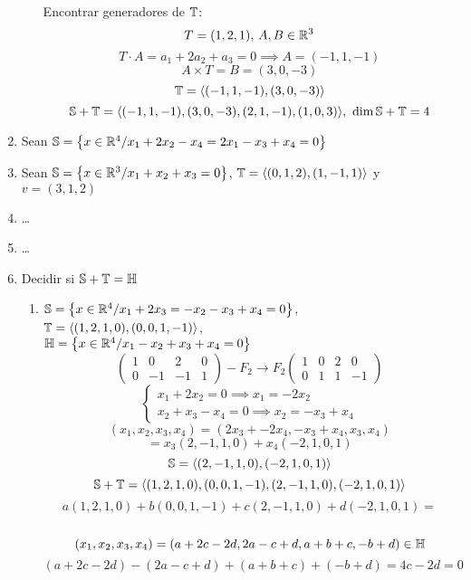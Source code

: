 \documentclass[../practica.root.tex]{subfiles}
\begin{document}
\begin{enumerate}
\begin{enumerate}
                    Encontrar generadores de $\T$:
                    \[ T = (1,2,1)\text{, }A, B \in \R^3 \]
                    \[ T\cdot A = a_1 + 2a_2 + a_3 = 0 \implies A = (-1,1,-1) \]
                    \[ A \times T = B = (3,0,-3) \]
                    \[ \T = \langle (-1,1,-1),(3,0,-3) \rangle \]
                    \[ \S + \T = \langle (-1,1,-1),(3,0,-3),(2,1,-1),(1,0,3) \rangle\text{, }\dim\S + \T = 4 \]
          \end{enumerate}
    \item Sean $\S = \left\{ x \in \R^4 / x_1 + 2x_2 - x_4 = 2x_1 - x_3 + x_4 = 0 \right\}$
    \item Sean $\S = \left\{ x \in \R^3 / x_1 + x_2 + x_3 = 0 \right\}$, $\T = \langle (0,1,2),(1,-1,1) \rangle$ y $v = (3,1,2)$
    \item \dots
    \item \dots
    \item Decidir si $\S+\T = \H$
          \begin{enumerate}
              \item $\S = \left\{ x \in \R^4 / x_1 + 2x_3 = -x_2 - x_3 + x_4 = 0\right\}$, $\T = \langle (1,2,1,0),(0,0,1,-1) \rangle$, \\$\H = \left\{ x \in \R^4 / x_1 - x_2 + x_3 + x_4 = 0 \right\}$
                    \[
                        \begin{pmatrix}
                            1 & 0  & 2  & 0 \\
                            0 & -1 & -1 & 1
                        \end{pmatrix} -F_2 \to F_2
                        \begin{pmatrix}
                            1 & 0 & 2 & 0  \\
                            0 & 1 & 1 & -1
                        \end{pmatrix}
                    \] \[
                        \begin{cases}
                            x_1 + 2x_2 = 0 \implies x_1 = -2x_2 \\
                            x_2 + x_3 - x_4 = 0 \implies x_2 = -x_3 + x_4
                        \end{cases}
                    \] \[
                        (x_1, x_2, x_3, x_4) = (2x_3 + -2x_4, -x_3+x_4, x_3, x_4)
                    \] \[
                        = x_3(2,-1,1,0) + x_4(-2,1,0,1)
                    \] \[
                        \S = \langle (2,-1,1,0),(-2,1,0,1) \rangle
                    \] \[
                        \S + \T = \langle (1,2,1,0),(0,0,1,-1),(2,-1,1,0),(-2,1,0,1) \rangle
                    \] \[
                        a(1,2,1,0) + b(0,0,1,-1) + c(2,-1,1,0) + d(-2,1,0,1) =
                    \] \[
                        (x_1, x_2, x_3, x_4) = (a+2c-2d,2a-c+d,a+b+c,-b+d) \in \H
                    \] \[
                        (a+2c-2d) - (2a-c+d) + (a+b+c) + (-b+d) = 4c-2d = 0
                    \]


\end{enumerate}
\end{enumerate}
\end{document}
